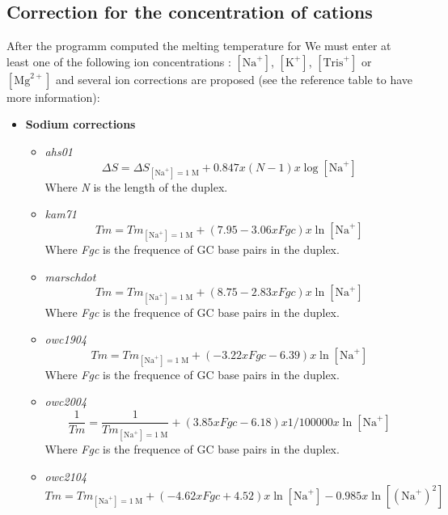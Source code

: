 \documentclass{article}
\begin{document}
\subsection{Correction for the concentration of cations}  

After the programm computed the melting temperature for 
We must enter at least one of the following ion concentrations : $[\mbox{Na}^+]$, $[\mbox{K}^+]$, $[\mbox{Tris}^+]$ or
$[\mbox{Mg}^{2+}]$ and several ion corrections are proposed  (see the reference table to have more information):
\begin{itemize}
\item \textbf{Sodium corrections}
 \begin{itemize}
 \item \textit{ahs01}
 \begin{displaymath}
  \Delta{}S=\Delta{}S_{[\mbox{Na}^+]=1\;\mathrm{M}}+0.847 x (N - 1) x \log [\mbox{Na}^+]   
 \end{displaymath}
 Where \emph{N} is the length of the duplex.
 \item \textit{kam71}
 \begin{displaymath}
  Tm=Tm_{[\mbox{Na}^+]=1\;\mathrm{M}}+(7.95 - 3.06 x Fgc) x \ln [\mbox{Na}^+]  
 \end{displaymath}
 Where \emph{Fgc} is the frequence of GC base pairs in the duplex.
 \item \textit{marschdot}
 \begin{displaymath}
  Tm=Tm_{[\mbox{Na}^+]=1\;\mathrm{M}}+ (8.75 - 2.83 x Fgc) x \ln [\mbox{Na}^+]  
 \end{displaymath}
 Where \emph{Fgc} is the frequence of GC base pairs in the duplex.
 \item \textit{owc1904}
 \begin{displaymath}
  Tm=Tm_{[\mbox{Na}^+]=1\;\mathrm{M}}+ (-3.22 x Fgc - 6.39) x \ln [\mbox{Na}^+]  
 \end{displaymath}
 Where \emph{Fgc} is the frequence of GC base pairs in the duplex.
 \item \textit{owc2004}
 \begin{displaymath}
 \frac{1}{Tm}=\frac{1}{Tm_{[\mbox{Na}^+]=1\;\mathrm{M}}}+ (3.85 x Fgc - 6.18) x 1 / 100000 x \ln [\mbox{Na}^+]  
 \end{displaymath}
 Where \emph{Fgc} is the frequence of GC base pairs in the duplex.
 \item \textit{owc2104}
 \begin{displaymath}
 Tm=Tm_{[\mbox{Na}^+]=1\;\mathrm{M}}+ (-4.62 x Fgc + 4.52) x \ln [\mbox{Na}^+] - 0.985 x \ln [(\mbox{Na}^+)^2]  

\end{displaymath}
\end{itemize}
\end{itemize}
\end{document}

